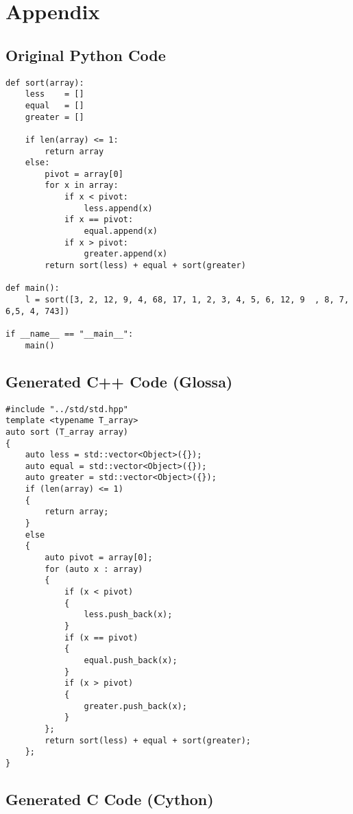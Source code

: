 \documentclass{article}
\begin{document}
\section{Appendix}

\newpage
\subsection{Original Python Code}

\lstset{language=Python}
\begin{lstlisting}
def sort(array):
    less    = []
    equal   = []
    greater = []

    if len(array) <= 1:
        return array
    else:
        pivot = array[0]
        for x in array:
            if x < pivot:
                less.append(x)
            if x == pivot:
                equal.append(x)
            if x > pivot:
                greater.append(x)
        return sort(less) + equal + sort(greater)

def main():
    l = sort([3, 2, 12, 9, 4, 68, 17, 1, 2, 3, 4, 5, 6, 12, 9  , 8, 7, 6,5, 4, 743])

if __name__ == "__main__":
    main()
\end{lstlisting}

\lstset{language=C}

\newpage
\subsection{Generated C++ Code (Glossa)}

\begin{lstlisting}
#include "../std/std.hpp"
template <typename T_array>
auto sort (T_array array)
{
    auto less = std::vector<Object>({});
    auto equal = std::vector<Object>({});
    auto greater = std::vector<Object>({});
    if (len(array) <= 1)
    {
        return array;
    }
    else
    {
        auto pivot = array[0];
        for (auto x : array)
        {
            if (x < pivot)
            {
                less.push_back(x);
            }
            if (x == pivot)
            {
                equal.push_back(x);
            }
            if (x > pivot)
            {
                greater.push_back(x);
            }
        };
        return sort(less) + equal + sort(greater);
    };
}
\end{lstlisting}

\newpage
\subsection{Generated C Code (Cython)}
\end{document}
